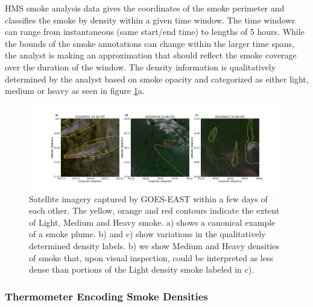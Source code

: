 \documentclass{ametsocV6.1}
\begin{document}
HMS smoke analysis data gives the coordinates of the smoke perimeter and classifies the smoke by density within a given time window. The time windows can range from instantaneous (same start/end time) to lengths of 5 hours. While the bounds of the smoke annotations can change within the larger time spans, the analyst is making an approximation that should reflect the smoke coverage over the duration of the window. The density information is qualitatively determined by the analyst based on smoke opacity and categorized as either light, medium or heavy as seen in figure \ref{densities}a.

\begin{figure}
    \centering
    \includegraphics[width=15cm]{figures/Misclassified.png}
    \caption{Satellite imagery captured by GOES-EAST within a few days of each other. The yellow, orange and red contours indicate the extent of Light, Medium and Heavy smoke.  a) shows a canonical example of a smoke plume. b) and c) show variations in the qualitatively determined density labels. b) we show Medium and Heavy densities of smoke that, upon visual inspection, could be interpreted as less dense than portions of the Light density smoke labeled in c).}\label{densities}
\end{figure}


\subsubsection*{Thermometer Encoding Smoke Densities}
\end{document}
